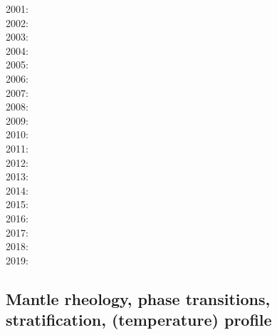 2001: \cite{vank01}\cite{riyb01}\cite{lemo01}\\
2002: \cite{tasu02}\cite{modm02}\cite{tack02}\\
2003: \cite{hapa03}\cite{lemo03}\cite{mumc03}\cite{fasa03}\cite{heta03}\\
2004: \cite{vavv04b}\cite{xita04b}\cite{xita04}\\
2005: \cite{taxn05}\cite{bupc05}\cite{grlt05}\cite{lemj05}\cite{kogk05}\cite{mczh05b}\\
2006: \cite{beck06}\cite{nake06}\cite{losh06}\\
2007: \cite{nake07}\cite{mayu07}\cite{brva07a}\cite{brva07b}\cite{grlt07}\cite{grlt07b}\cite{huda07}\\
2008: \cite{tack08}\cite{chhl08}\cite{brhv08}\cite{deta08}\cite{plva08}\cite{hole08}\\
2009: \cite{wodd09}\cite{fobe09}\cite{gows09}\cite{deta09}\cite{onlj09}\cite{wazh09}\\
2010: \cite{bumb10}\cite{detn10}\cite{yayh10}\cite{nata10}\cite{hole10}\cite{zhzl10}\\
2011: \cite{lowm11}\cite{rota11}\cite{woda11}\cite{lemj11}\cite{befa11}\\
2012: \cite{bisa12}\cite{cort12b}\cite{deyt12}\cite{solo12}\\
2013: \cite{holj13}\cite{dadb13}\cite{toyd13}\cite{bogs13a}\cite{busa13}\cite{mika13}
      \cite{fabc13}\cite{cosr13}\cite{coml13}\cite{cost13}\\
2014: \cite{arfw14}\cite{helo14}\cite{crta14}\cite{flgw14}\cite{roct14}\cite{cort14}\cite{becr14}\\
2015: \cite{thkp15}\cite{wegg15}\cite{bect15}\\
2016: \cite{frbs16}\cite{sisc16}\cite{boba16}\cite{wele16}\cite{welm16}\\
2017: \cite{ghts17}\\
2018: \cite{cold18}\cite{arcf18}\cite{cosh18}\cite{wele18}\\
2019: \cite{gult19}\cite{mazh19}\cite{cohf19}\cite{lewh19}\cite{ulcw19}\cite{boba19}

\subsection*{Mantle rheology, phase transitions, stratification, (temperature) profile}

